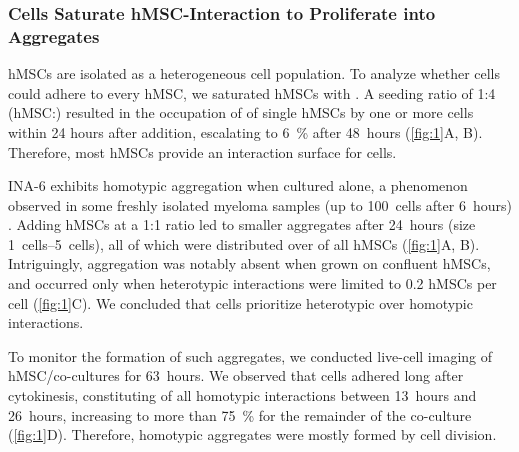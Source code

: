 \newpage





\label{C1:results}%
% 
% 
% 
\subsubsection*{\INA Cells Saturate hMSC-Interaction to Proliferate into Aggregates}%
\label{C1:results_saturation}%
hMSCs are isolated as a heterogeneous cell population. To analyze whether \INA
cells could adhere to every hMSC, we saturated hMSCs with \INA. A seeding ratio
of 1:4 (hMSC:\INA) resulted in the occupation of 
of single hMSCs by one or more \INA cells within 24 hours after \INA addition,
escalating to \SI{6}{\percent} after \SI{48}{hours} (\autoref{fig:1}A, B).
Therefore, most hMSCs provide an interaction surface for \INA cells.

INA-6 exhibits homotypic aggregation when cultured alone, a phenomenon observed
in some freshly isolated myeloma samples (up to \SI{100}{cells} after
\SI{6}{hours}) \cite{kawanoHomotypicCellAggregations1991a,
    okunoVitroGrowthPattern1991}. Adding hMSCs at a 1:1 ratio led to smaller
aggregates after \SI{24}{hours} (size \SIrange{1}{5}{cells}), all of which were
distributed over  of all hMSCs (\autoref{fig:1}A,
B). Intriguingly, \INA aggregation was notably absent when grown on confluent
hMSCs, and occurred only when heterotypic interactions were limited to 0.2 hMSCs
per \INA cell (\autoref{fig:1}C). We concluded that \INA cells prioritize
heterotypic over homotypic interactions.

To monitor the formation of such aggregates, we conducted live-cell imaging of
\linebreak
hMSC/\INA co-cultures for \SI{63}{hours}. We observed that \INA cells adhered
long after cytokinesis, constituting  of all
homotypic interactions between \SI{13}{hours} and \SI{26}{hours}, increasing to
more than \SI{75}{\percent} for the remainder of the co-culture
(\autoref{fig:1}D). Therefore, homotypic \INA aggregates were mostly formed by
cell division.

